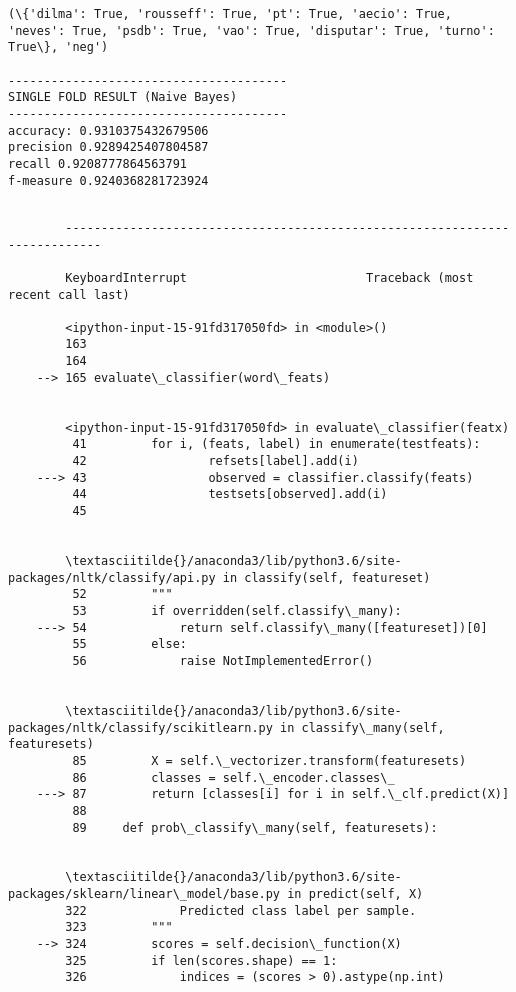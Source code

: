 \documentclass[11pt]{article}
\begin{document}
    \begin{Verbatim}[commandchars=\\\{\}]
(\{'dilma': True, 'rousseff': True, 'pt': True, 'aecio': True, 'neves': True, 'psdb': True, 'vao': True, 'disputar': True, 'turno': True\}, 'neg')

---------------------------------------
SINGLE FOLD RESULT (Naive Bayes)
---------------------------------------
accuracy: 0.9310375432679506
precision 0.9289425407804587
recall 0.9208777864563791
f-measure 0.9240368281723924

    \end{Verbatim}

    \begin{Verbatim}[commandchars=\\\{\}]

        ---------------------------------------------------------------------------

        KeyboardInterrupt                         Traceback (most recent call last)

        <ipython-input-15-91fd317050fd> in <module>()
        163 
        164 
    --> 165 evaluate\_classifier(word\_feats)
    

        <ipython-input-15-91fd317050fd> in evaluate\_classifier(featx)
         41         for i, (feats, label) in enumerate(testfeats):
         42                 refsets[label].add(i)
    ---> 43                 observed = classifier.classify(feats)
         44                 testsets[observed].add(i)
         45 


        \textasciitilde{}/anaconda3/lib/python3.6/site-packages/nltk/classify/api.py in classify(self, featureset)
         52         """
         53         if overridden(self.classify\_many):
    ---> 54             return self.classify\_many([featureset])[0]
         55         else:
         56             raise NotImplementedError()


        \textasciitilde{}/anaconda3/lib/python3.6/site-packages/nltk/classify/scikitlearn.py in classify\_many(self, featuresets)
         85         X = self.\_vectorizer.transform(featuresets)
         86         classes = self.\_encoder.classes\_
    ---> 87         return [classes[i] for i in self.\_clf.predict(X)]
         88 
         89     def prob\_classify\_many(self, featuresets):


        \textasciitilde{}/anaconda3/lib/python3.6/site-packages/sklearn/linear\_model/base.py in predict(self, X)
        322             Predicted class label per sample.
        323         """
    --> 324         scores = self.decision\_function(X)
        325         if len(scores.shape) == 1:
        326             indices = (scores > 0).astype(np.int)



\end{Verbatim}
\end{document}
